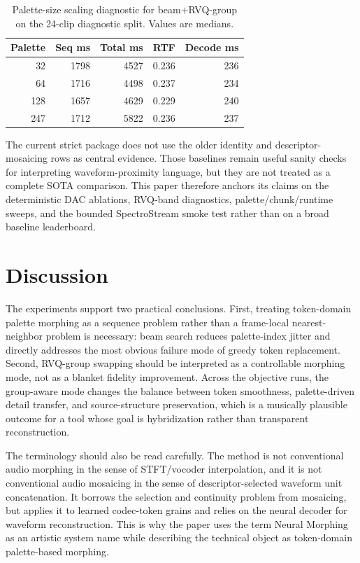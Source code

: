 \documentclass[twoside,a4paper]{article}
\begin{document}
\begin{table}[!t]
    \centering
    \scriptsize
    \setlength{\tabcolsep}{2.8pt}
    \caption{Palette-size scaling diagnostic for beam+RVQ-group on the 24-clip diagnostic split. Values are medians.}
    \label{tab:palette-scaling}
    \begin{tabular}{rrrrr}
    \toprule
    Palette & Seq ms & Total ms & RTF & Decode ms \\
    \midrule
    32 & 1798 & 4527 & 0.236 & 236 \\
    64 & 1716 & 4498 & 0.237 & 234 \\
    128 & 1657 & 4629 & 0.229 & 240 \\
    247 & 1712 & 5822 & 0.236 & 237 \\
    \bottomrule
    \end{tabular}
\end{table}

The current strict package does not use the older identity and descriptor-mosaicing rows as central evidence. Those baselines remain useful sanity checks for interpreting waveform-proximity language, but they are not treated as a complete SOTA comparison. This paper therefore anchors its claims on the deterministic DAC ablations, RVQ-band diagnostics, palette/chunk/runtime sweeps, and the bounded SpectroStream smoke test rather than on a broad baseline leaderboard.


\section{Discussion}

The experiments support two practical conclusions. First, treating token-domain palette morphing as a sequence problem rather than a frame-local nearest-neighbor problem is necessary: beam search reduces palette-index jitter and directly addresses the most obvious failure mode of greedy token replacement. Second, RVQ-group swapping should be interpreted as a controllable morphing mode, not as a blanket fidelity improvement. Across the objective runs, the group-aware mode changes the balance between token smoothness, palette-driven detail transfer, and source-structure preservation, which is a musically plausible outcome for a tool whose goal is hybridization rather than transparent reconstruction.

The terminology should also be read carefully. The method is not conventional audio morphing in the sense of STFT/vocoder interpolation, and it is not conventional audio mosaicing in the sense of descriptor-selected waveform unit concatenation. It borrows the selection and continuity problem from mosaicing, but applies it to learned codec-token grains and relies on the neural decoder for waveform reconstruction. This is why the paper uses the term Neural Morphing as an artistic system name while describing the technical object as token-domain palette-based morphing.
\end{document}
